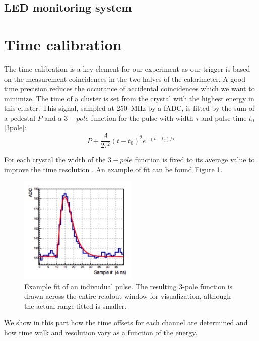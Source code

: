 \documentclass[review]{elsarticle}
\begin{document}
\subsection{LED monitoring system}





\section{Time calibration}

The time calibration is a key element for our experiment as our trigger is 
based on the measurement coincidences in the two halves of the calorimeter. 
A good time precision reduces the occurance of accidental coincidences which 
we want to minimize. The time of a cluster is set from the crystal with the 
highest energy in this cluster. This signal, sampled at 250~MHz by a fADC, is 
fitted by the sum of a pedestal $P$ and a $3-pole$ function for the pulse with 
width $\tau$ and pulse time $t_{0}$ \ref{3pole}:
\begin{equation}
P + \frac{A}{2 \tau^{2}} \left( t-t_{0} \right)^{2} e^{- \left( t-t_{0} \right) / \tau}
\label{3pole}
\end{equation}

For each crystal the width of the $3-pole$ function is fixed to its average value to improve the time resolution \cite{NathansNote}. An example of fit can be found Figure \ref{PulseFit}.

\begin{figure}[ht!]
\centering
\includegraphics[width=0.50\textwidth]{pulseFit.png}
\caption{Example fit of an indivudual pulse. The resulting 3-pole function is drawn across the entire readout window for visualization, although the actual range fitted is smaller.}
\label{PulseFit}
\end{figure}

We show in this part how the time offsets for each channel are
determined and how time walk and resolution vary as a function 
of the energy.
\end{document}
